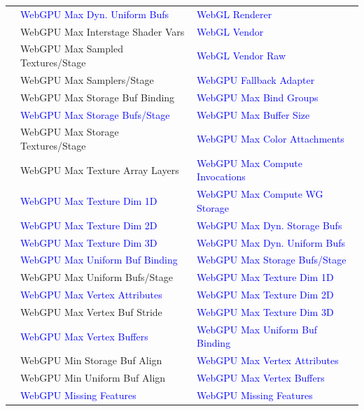 {\begin{longtable}{l | l | l}
 & \textcolor{blue}{WebGPU Max Dyn. Uniform Bufs} & \textcolor{blue}{WebGL Renderer} \\
 & WebGPU Max Interstage Shader Vars & \textcolor{blue}{WebGL Vendor} \\
 & WebGPU Max Sampled Textures/Stage & \textcolor{blue}{WebGL Vendor Raw} \\
 & WebGPU Max Samplers/Stage & \textcolor{blue}{WebGPU Fallback Adapter} \\
 & WebGPU Max Storage Buf Binding & \textcolor{blue}{WebGPU Max Bind Groups} \\
 & \textcolor{blue}{WebGPU Max Storage Bufs/Stage} & \textcolor{blue}{WebGPU Max Buffer Size} \\
 & WebGPU Max Storage Textures/Stage & \textcolor{blue}{WebGPU Max Color Attachments} \\
 & WebGPU Max Texture Array Layers & \textcolor{blue}{WebGPU Max Compute Invocations} \\
 & \textcolor{blue}{WebGPU Max Texture Dim 1D} & \textcolor{blue}{WebGPU Max Compute WG Storage} \\
 & \textcolor{blue}{WebGPU Max Texture Dim 2D} & \textcolor{blue}{WebGPU Max Dyn. Storage Bufs} \\
 & \textcolor{blue}{WebGPU Max Texture Dim 3D} & \textcolor{blue}{WebGPU Max Dyn. Uniform Bufs} \\
 & \textcolor{blue}{WebGPU Max Uniform Buf Binding} & \textcolor{blue}{WebGPU Max Storage Bufs/Stage} \\
 & WebGPU Max Uniform Bufs/Stage & \textcolor{blue}{WebGPU Max Texture Dim 1D} \\
 & \textcolor{blue}{WebGPU Max Vertex Attributes} & \textcolor{blue}{WebGPU Max Texture Dim 2D} \\
 & WebGPU Max Vertex Buf Stride & \textcolor{blue}{WebGPU Max Texture Dim 3D} \\
 & \textcolor{blue}{WebGPU Max Vertex Buffers} & \textcolor{blue}{WebGPU Max Uniform Buf Binding} \\
 & WebGPU Min Storage Buf Align & \textcolor{blue}{WebGPU Max Vertex Attributes} \\
 & WebGPU Min Uniform Buf Align & \textcolor{blue}{WebGPU Max Vertex Buffers} \\
 & \textcolor{blue}{WebGPU Missing Features} & \textcolor{blue}{WebGPU Missing Features} \\
\end{longtable}
}
